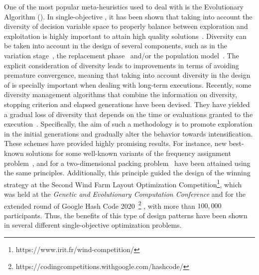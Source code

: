 One of the most popular meta-heuristics used to deal with \MOPS{} is the Evolutionary Algorithm (\EA{}).
%
In single-objective \EAS{}, it has been shown that taking into account the diversity of decision variable space
to properly balance between exploration and exploitation is highly important to attain high quality 
solutions~\citep{Joel:BALANCE_DIVERSITY}.
%
Diversity can be taken into account in the design of several components, such as in the variation 
stage~\citep{Joel:FUZZY_ADAPTIVE_GA,Joel:CROSSOVER_DIVERSITY}, the replacement phase~\citep{Joel:MULTI_DYNAMIC} 
and/or the population model~\citep{Joel:SAWTOOTH}.
%
The explicit consideration of diversity leads to improvements in terms of avoiding premature convergence, 
meaning that taking into account diversity in the design of \EAS{} is specially important when dealing 
with long-term executions.
%
Recently, some diversity management algorithms that combine the information on diversity, stopping criterion and elapsed 
generations have been devised.
%
They have yielded a gradual loss of diversity that depends on the time or evaluations granted to the 
execution~\citep{Joel:MULTI_DYNAMIC}.
%
Specifically, the aim of such a methodology is to promote exploration in the initial generations and gradually alter the 
behavior towards intensification.
%
These schemes have provided highly promising results.
%
For instance, new best-known solutions for some well-known variants of the frequency assignment problem~\citep{Segura:17},
and for a two-dimensional packing problem~\citep{Joel:MULTI_DYNAMIC} have been attained using the same principles.
%
Additionally, this principle guided the design of the winning strategy at the Second Wind Farm Layout Optimization 
Competition\footnote{https://www.irit.fr/wind-competition/}, which was held at the {\em Genetic and Evolutionary 
Computation Conference} and for the extended round of Google Hash Code 2020~\footnote{https://codingcompetitions.withgoogle.com/hashcode/}
, with more than $100,000$ participants.
%
Thus, the benefits of this type of design patterns have been shown in several different single-objective optimization problems.

